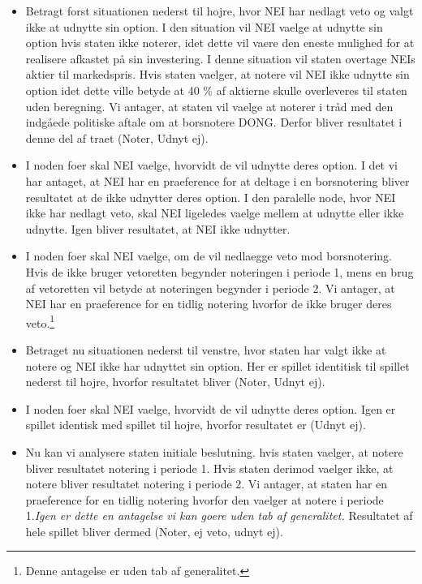 \documentclass{article}
\begin{document}
\begin{itemize}

	\item Betragt forst situationen nederst til hojre, hvor NEI har nedlagt veto og valgt ikke at udnytte sin option. I den situation vil NEI vaelge at udnytte sin option hvis staten ikke noterer, idet dette vil vaere den eneste mulighed for at realisere afkastet på sin investering. I denne situation vil staten overtage NEIs aktier til markedspris. Hvis staten vaelger, at notere vil NEI ikke udnytte sin option idet dette ville betyde at 40 \% af aktierne skulle overleveres til staten uden beregning. Vi antager, at staten vil vaelge at noterer i tråd med den indgåede politiske aftale om at borsnotere DONG. Derfor bliver resultatet i denne del af traet (Noter, Udnyt ej).

	\item I noden foer skal NEI vaelge, hvorvidt de vil udnytte deres option. I det vi har antaget, at NEI har en praeference for at deltage i en borsnotering bliver resultatet at de ikke udnytter deres option. I den paralelle node, hvor NEI ikke har nedlagt veto, skal NEI ligeledes vaelge mellem at udnytte eller ikke udnytte. Igen bliver resultatet, at NEI ikke udnytter.
	
			\item I noden foer skal NEI vaelge, om de vil nedlaegge veto mod borsnotering. Hvis de ikke bruger vetoretten begynder noteringen i periode 1, mens en brug af vetoretten vil betyde at noteringen begynder i periode 2. Vi antager, at NEI har en praeference for en tidlig notering hvorfor de ikke bruger deres veto.\footnote{Denne antagelse er uden tab af generalitet.}
	
	\item Betraget nu situationen nederst til venstre, hvor staten har valgt ikke at notere og NEI ikke har udnyttet sin option. Her er spillet identitisk til spillet nederst til hojre, hvorfor resultatet bliver (Noter, Udnyt ej).
	
	\item I noden foer skal NEI vaelge, hvorvidt de vil udnytte deres option. Igen er spillet identisk med spillet til hojre, hvorfor resultatet er (Udnyt ej). 
	
	\item Nu kan vi analysere staten initiale beslutning. hvis staten vaelger, at notere bliver resultatet notering i periode 1. Hvis staten derimod vaelger ikke, at notere bliver resultatet notering i periode 2. Vi antager, at staten har en praeference for en tidlig notering hvorfor den vaelger at notere i periode 1.\emph{Igen er dette en antagelse vi kan goere uden tab af generalitet.} Resultatet af hele spillet bliver dermed (Noter, ej veto, udnyt ej).
 
\end{itemize}
\end{document}

